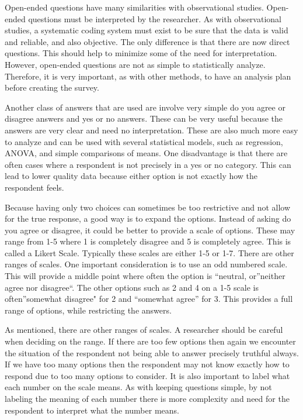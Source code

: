 \documentclass[]{book}
\theoremstyle{definition}
\theoremstyle{definition}
\theoremstyle{definition}
\theoremstyle{remark}
\begin{document}
Open-ended questions have many similarities with observational studies.
Open-ended questions must be interpreted by the researcher. As with
observational studies, a systematic coding system must exist to be sure
that the data is valid and reliable, and also objective. The only
difference is that there are now direct questions. This should help to
minimize some of the need for interpretation. However, open-ended
questions are not as simple to statistically analyze. Therefore, it is
very important, as with other methods, to have an analysis plan before
creating the survey.

Another class of answers that are used are involve very simple do you
agree or disagree answers and yes or no answers. These can be very
useful because the answers are very clear and need no interpretation.
These are also much more easy to analyze and can be used with several
statistical models, such as regression, ANOVA, and simple comparisons of
means. One disadvantage is that there are often cases where a respondent
is not precisely in a yes or no category. This can lead to lower quality
data because either option is not exactly how the respondent feels.

Because having only two choices can sometimes be too restrictive and not
allow for the true response, a good way is to expand the options.
Instead of asking do you agree or disagree, it could be better to
provide a scale of options. These may range from 1-5 where 1 is
completely disagree and 5 is completely agree. This is called a Likert
Scale. Typically these scales are either 1-5 or 1-7. There are other
ranges of scales. One important consideration is to use an odd numbered
scale. This will provide a middle point where often the option is
``neutral, or''neither agree nor disagree``. The other options such as 2
and 4 on a 1-5 scale is often''somewhat disagree" for 2 and ``somewhat
agree'' for 3. This provides a full range of options, while restricting
the answers.

As mentioned, there are other ranges of scales. A researcher should be
careful when deciding on the range. If there are too few options then
again we encounter the situation of the respondent not being able to
answer precisely truthful always. If we have too many options then the
respondent may not know exactly how to respond due to too many options
to consider. It is also important to label what each number on the scale
means. As with keeping questions simple, by not labeling the meaning of
each number there is more complexity and need for the respondent to
interpret what the number means.
\end{document}
